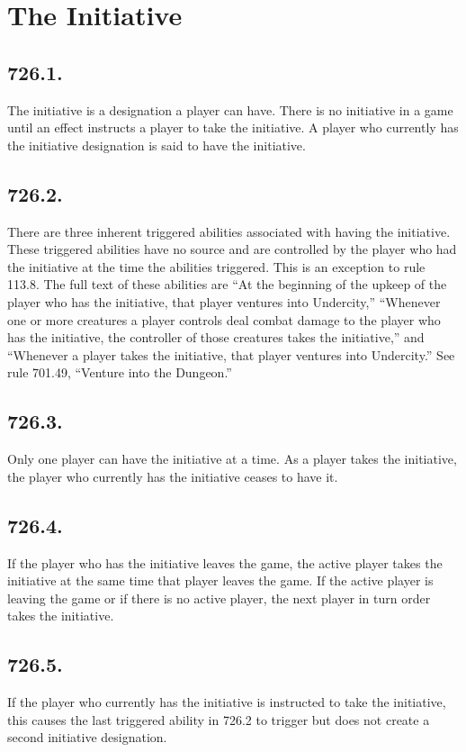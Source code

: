 \section{The Initiative}
\subsection*{726.1.}
The initiative is a designation a player can have. There is no initiative in a game until an effect instructs a player to take the initiative. A player who currently has the initiative designation is said to have the initiative.

\subsection*{726.2.}
There are three inherent triggered abilities associated with having the initiative. These triggered abilities have no source and are controlled by the player who had the initiative at the time the abilities triggered. This is an exception to rule 113.8. The full text of these abilities are “At the beginning of the upkeep of the player who has the initiative, that player ventures into Undercity,” “Whenever one or more creatures a player controls deal combat damage to the player who has the initiative, the controller of those creatures takes the initiative,” and “Whenever a player takes the initiative, that player ventures into Undercity.” See rule 701.49, “Venture into the Dungeon.”

\subsection*{726.3.}
Only one player can have the initiative at a time. As a player takes the initiative, the player who currently has the initiative ceases to have it.

\subsection*{726.4.}
If the player who has the initiative leaves the game, the active player takes the initiative at the same time that player leaves the game. If the active player is leaving the game or if there is no active player, the next player in turn order takes the initiative.

\subsection*{726.5.}
If the player who currently has the initiative is instructed to take the initiative, this causes the last triggered ability in 726.2 to trigger but does not create a second initiative designation.

